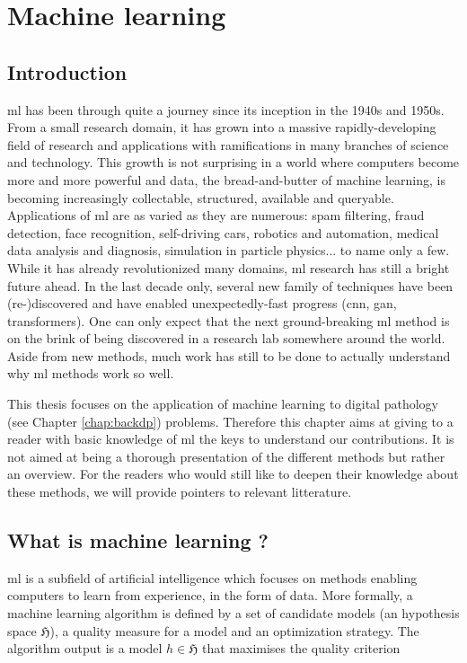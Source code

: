 \chapter{Machine learning}
\label{chap:backml}

\section{Introduction}
\label{sec:backml:intro}

\acrlong{ml} has been through quite a journey since its inception in the 1940s and 1950s. From a small research domain, it has grown into a massive rapidly-developing field of research and applications with ramifications in many branches of science and technology. This growth is not surprising in a world where computers become more and more powerful and data, the bread-and-butter of machine learning, is becoming increasingly collectable, structured, available and queryable. Applications of \acrshort{ml} are as varied as they are numerous: spam filtering, fraud detection, face recognition, self-driving cars, robotics and automation, medical data analysis and diagnosis, simulation in particle physics... to name only a few. While it has already revolutionized many domains, \acrshort{ml} research has still a bright future ahead. In the last decade only, several new family of techniques have been (re-)discovered and have enabled unexpectedly-fast progress (\eg \acrlong{cnn}, \acrlong{gan}, transformers). One can only expect that the next ground-breaking \acrshort{ml} method is on the brink of being discovered in a research lab somewhere around the world. Aside from new methods, much work has still to be done to actually understand why \acrshort{ml} methods work so well. 

This thesis focuses on the application of machine learning to digital pathology (see Chapter \ref{chap:backdp}) problems. Therefore this chapter aims at giving to a reader with basic knowledge of \acrshort{ml} the keys to understand our contributions. It is not aimed at being a thorough presentation of the different methods but rather an overview. For the readers who would still like to deepen their knowledge about these methods, we will provide pointers to relevant litterature.  

\section{What is machine learning ?} 
\label{sec:backml:whatisml}

\acrlong{ml} is a subfield of artificial intelligence which focuses on methods enabling computers to learn from experience, in the form of data. More formally, a machine learning algorithm is defined by a set of candidate models (\ie an hypothesis space $\mathfrak{H}$), a quality measure for a model and an optimization strategy. The algorithm output is a model $h \in \mathfrak{H}$ that maximises the quality criterion 


\section{}